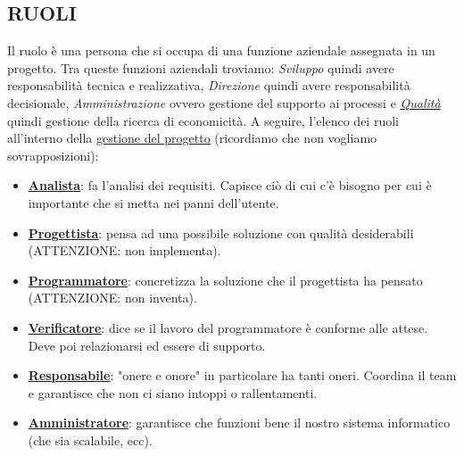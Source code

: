 		\subsection{RUOLI}  \label{ruoli} 
		Il ruolo è una persona che si occupa di una funzione aziendale assegnata in un progetto. Tra queste funzioni aziendali troviamo: \textit{Sviluppo} quindi avere responsabilità tecnica e realizzativa, \textit{Direzione} quindi avere responsabilità decisionale, \textit{Amministrazione} ovvero gestione del supporto ai processi e \textit{\underline{\hyperref[qualita]{Qualità}}} quindi gestione della ricerca di economicità.
		A seguire, l'elenco dei ruoli all'interno della \underline{\hyperref[gestioneprogetto]{gestione del progetto}} (ricordiamo che non vogliamo sovrapposizioni):
		\begin{itemize}
		\item \textbf{\underline{\hyperref[analista]{Analista}}}: fa l'analisi dei requisiti. Capisce ciò di cui c'è bisogno per cui è importante che si metta nei panni dell'utente.
		\item \textbf{\underline{\hyperref[progettista]{Progettista}}}: pensa ad una possibile soluzione con qualità desiderabili (ATTENZIONE: non implementa).
		\item \textbf{\underline{\hyperref[programmatore]{Programmatore}}}: concretizza la soluzione che il progettista ha pensato (ATTENZIONE: non inventa).
		\item \textbf{\underline{\hyperref[verificatore]{Verificatore}}}: dice se il lavoro del programmatore è conforme alle attese. Deve poi relazionarsi ed essere di supporto.
		\item \textbf{\underline{\hyperref[responsabile]{Responsabile}}}: "onere e onore" in particolare ha tanti oneri. Coordina il team e garantisce che non ci siano intoppi o rallentamenti.
		\item \textbf{\underline{\hyperref[amministratore]{Amministratore}}}: garantisce che funzioni bene il nostro sistema informatico (che sia scalabile, ecc).
		\end{itemize}		
	
	
